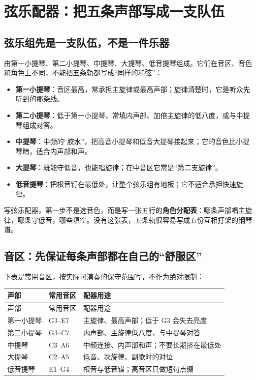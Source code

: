 \chapter{弦乐配器：把五条声部写成一支队伍}
\label{ch:strings}


\section{弦乐组先是一支队伍，不是一件乐器}
\label{sec:string-section}

由第一小提琴、第二小提琴、中提琴、大提琴、低音提琴组成。它们在音区、音色和角色上不同，不能把五条轨都写成“同样的和弦”：

\begin{itemize}
\item \textbf{第一小提琴}：音区最高，常承担主旋律或最高声部；旋律清楚时，它是听众先听到的那条线。
\item \textbf{第二小提琴}：低于第一小提琴，常填内声部、加倍主旋律的低八度，或与中提琴组成对答。
\item \textbf{中提琴}：中频的“胶水”，把高音小提琴和低音大提琴接起来；它的音色比小提琴暗，适合内声部和声。
\item \textbf{大提琴}：既能守低音，也能唱旋律；在中音区它常是“第二支旋律”。
\item \textbf{低音提琴}：把根音钉在最低处，让整个弦乐组有地板；它不适合承担快速旋律。
\end{itemize}

写弦乐配器，第一步不是选音色，而是写一张五行的\textbf{角色分配表}：哪条声部唱主旋律，哪条守低音，哪些填空。没有这张表，五条轨很容易写成五份互相打架的钢琴谱。

\section{音区：先保证每条声部都在自己的“舒服区”}
\label{sec:string-ranges}

下表是常用音区，按实际可演奏的保守范围写，不作为绝对限制：

\begin{longtable}{p{}p{}p{}}
\toprule
声部 & 常用音区 & 配器用途 \\
\midrule
\endfirsthead
\toprule
声部 & 常用音区 & 配器用途 \\
\midrule
\endhead
第一小提琴 & G3--E7 & 主旋律、最高声部；低于 G3 会失去亮度 \\
第二小提琴 & G3--C7 & 内声部、主旋律低八度、与中提琴对答 \\
中提琴 & C3--A6 & 中频连接、内声部和声；不要长期挤在最低处 \\
大提琴 & C2--A5 & 低音、次旋律、副歌时的对位 \\
低音提琴 & E1--G4 & 根音与低音锚；高音区只做短句点缀 \\
\bottomrule
\end{longtable}

